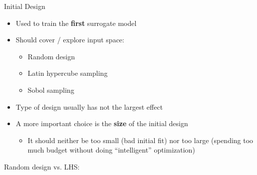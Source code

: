 \documentclass[11pt,compress,t,notes=noshow, xcolor=table]{beamer}
\begin{document}
\begin{vbframe}{Initial Design}

\begin{itemize}
\item Used to train the \textbf{first} surrogate model
\item Should cover / explore input space:
\begin{itemize}
  \item Random design
  \item Latin hypercube sampling
  \item Sobol sampling
\end{itemize}
\item Type of design usually has not the largest effect
\item A more important choice is the \textbf{size} of the initial design
\begin{itemize}
  \item It should neither be too small (bad initial fit) nor too large (spending too much budget without doing \enquote{intelligent} optimization)
\end{itemize}
\end{itemize}

\framebreak

Random design vs. LHS:

\vspace{+0.45cm}


\end{vbframe}
\end{document}
